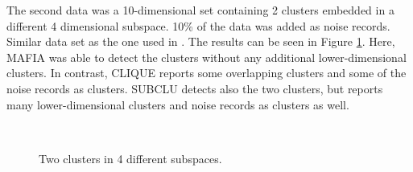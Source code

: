 The second data was a 10-dimensional set containing 2 clusters embedded in a different 4 dimensional subspace. 10\% of the data was added as noise records. Similar data set as the one used in \cite{mafia}. The results can be seen in Figure \ref{fig:accuracy_2clusters}. Here, MAFIA was able to detect the clusters without any additional lower-dimensional clusters. In contrast, CLIQUE reports some overlapping clusters and some of the noise records as clusters. SUBCLU detects also the two clusters, but reports many lower-dimensional clusters and noise records as clusters as well.
\begin{figure}[H]
    \vspace*{-0.5cm}
    \centering
    ~~~~
    ~~~~
    \caption{Two clusters in 4 different subspaces.}
    \label{fig:accuracy_2clusters}
    \vspace*{-0.5cm}
\end{figure}

